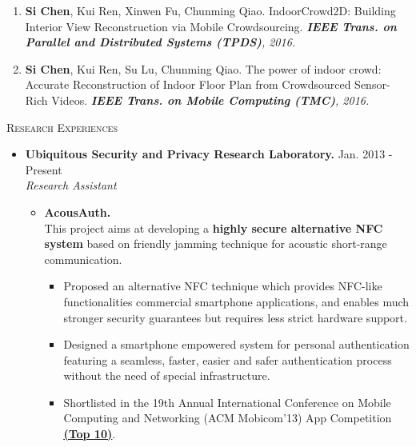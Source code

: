 \documentclass[letter]{article}
\newcommand{\heading}[1]{\item \large \textsc{#1} \normalsize}
\newenvironment{experience}[4]{
\item \textbf{#1.} \hfill #3 - #4 \\
\emph{#2}
}{
}
\newcommand{\publication}[4]{\item #1. #2. \emph{#3.} #4}
\begin{document}
\begin{description}
\begin{enumerate}[{U-}1.]
\publication{\textbf{Si Chen}, Kui Ren, Xinwen Fu, Chunming Qiao} {IndoorCrowd2D: Building Interior View Reconstruction via Mobile Crowdsourcing}
{\textbf{IEEE Trans. on Parallel and Distributed Systems (TPDS)}, 2016}\\

\publication{\textbf{Si Chen}, Kui Ren, Su Lu, Chunming Qiao} {The power of indoor crowd: Accurate Reconstruction of Indoor Floor Plan from Crowdsourced Sensor-Rich Videos}
{\textbf{IEEE Trans. on Mobile Computing (TMC)}, 2016}\\




\end{enumerate}

\heading{Research Experiences}

\begin{itemize}

\begin{experience}
{Ubiquitous Security and Privacy Research Laboratory}
{Research Assistant}
{Jan. 2013}{Present}
\begin{itemize}


\item \textbf{AcousAuth.} \\
This project aims at developing a \textbf{highly secure alternative NFC system} based on friendly jamming technique for acoustic short-range communication. 
\begin{itemize}

\item Proposed an alternative NFC technique which provides NFC-like functionalities commercial smartphone applications, and enables much stronger security guarantees but requires less strict hardware support. 
\item Designed a smartphone empowered system for personal authentication featuring
a seamless, faster, easier and safer authentication process without the need of special
infrastructure.
\item Shortlisted in the 19th Annual International Conference on Mobile Computing and Networking (ACM Mobicom'13) App Competition \href{http://www.sigmobile.org/mobicom/2013/app_finalists.html}{\textbf{\underline{(Top 10)}}}.
\end{itemize}



\end{itemize}
\end{experience}
\end{itemize}
\end{description}
\end{document}
